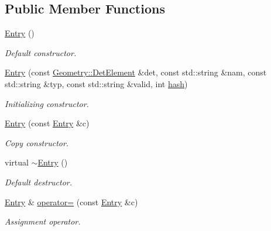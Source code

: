 \subsection*{Public Member Functions}
\begin{DoxyCompactItemize}
\item 
\hyperlink{class_d_d4hep_1_1_conditions_1_1_entry_a31e26e63b90fd0bb0d2772e5614f8afd}{Entry} ()
\begin{DoxyCompactList}\small\item\em Default constructor. \end{DoxyCompactList}\item 
\hyperlink{class_d_d4hep_1_1_conditions_1_1_entry_a73a537f284df0ad72a02913e7d938baa}{Entry} (const \hyperlink{class_d_d4hep_1_1_geometry_1_1_det_element}{Geometry\+::\+Det\+Element} \&det, const std\+::string \&nam, const std\+::string \&typ, const std\+::string \&valid, int \hyperlink{class_d_d4hep_1_1_conditions_1_1_entry_a7f213cb001c089b5aa3ed890aa1f05b5}{hash})
\begin{DoxyCompactList}\small\item\em Initializing constructor. \end{DoxyCompactList}\item 
\hyperlink{class_d_d4hep_1_1_conditions_1_1_entry_ae50bfee4f9aea43616b374050530cd57}{Entry} (const \hyperlink{class_d_d4hep_1_1_conditions_1_1_entry}{Entry} \&c)
\begin{DoxyCompactList}\small\item\em Copy constructor. \end{DoxyCompactList}\item 
virtual \hyperlink{class_d_d4hep_1_1_conditions_1_1_entry_ace080276d727881acfee7197b85f0b65}{$\sim$\+Entry} ()
\begin{DoxyCompactList}\small\item\em Default destructor. \end{DoxyCompactList}\item 
\hyperlink{class_d_d4hep_1_1_conditions_1_1_entry}{Entry} \& \hyperlink{class_d_d4hep_1_1_conditions_1_1_entry_a750c6f836c0cb9a0bb6975a8f1e9ee01}{operator=} (const \hyperlink{class_d_d4hep_1_1_conditions_1_1_entry}{Entry} \&c)
\begin{DoxyCompactList}\small\item\em Assignment operator. \end{DoxyCompactList}\end{DoxyCompactItemize}
